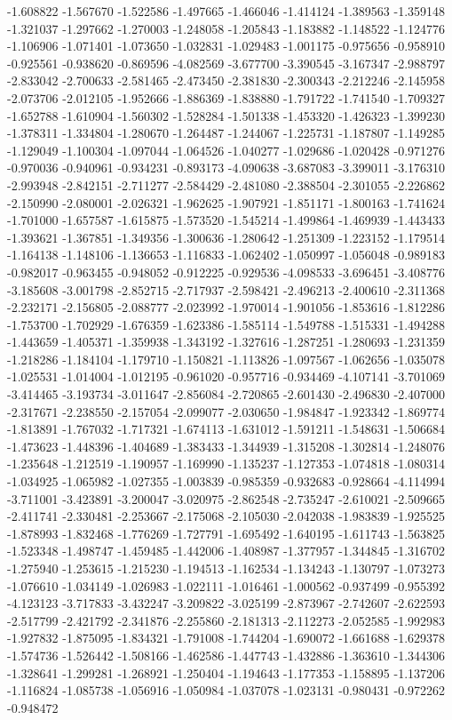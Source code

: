 -1.608822
-1.567670
-1.522586
-1.497665
-1.466046
-1.414124
-1.389563
-1.359148
-1.321037
-1.297662
-1.270003
-1.248058
-1.205843
-1.183882
-1.148522
-1.124776
-1.106906
-1.071401
-1.073650
-1.032831
-1.029483
-1.001175
-0.975656
-0.958910
-0.925561
-0.938620
-0.869596
-4.082569
-3.677700
-3.390545
-3.167347
-2.988797
-2.833042
-2.700633
-2.581465
-2.473450
-2.381830
-2.300343
-2.212246
-2.145958
-2.073706
-2.012105
-1.952666
-1.886369
-1.838880
-1.791722
-1.741540
-1.709327
-1.652788
-1.610904
-1.560302
-1.528284
-1.501338
-1.453320
-1.426323
-1.399230
-1.378311
-1.334804
-1.280670
-1.264487
-1.244067
-1.225731
-1.187807
-1.149285
-1.129049
-1.100304
-1.097044
-1.064526
-1.040277
-1.029686
-1.020428
-0.971276
-0.970036
-0.940961
-0.934231
-0.893173
-4.090638
-3.687083
-3.399011
-3.176310
-2.993948
-2.842151
-2.711277
-2.584429
-2.481080
-2.388504
-2.301055
-2.226862
-2.150990
-2.080001
-2.026321
-1.962625
-1.907921
-1.851171
-1.800163
-1.741624
-1.701000
-1.657587
-1.615875
-1.573520
-1.545214
-1.499864
-1.469939
-1.443433
-1.393621
-1.367851
-1.349356
-1.300636
-1.280642
-1.251309
-1.223152
-1.179514
-1.164138
-1.148106
-1.136653
-1.116833
-1.062402
-1.050997
-1.056048
-0.989183
-0.982017
-0.963455
-0.948052
-0.912225
-0.929536
-4.098533
-3.696451
-3.408776
-3.185608
-3.001798
-2.852715
-2.717937
-2.598421
-2.496213
-2.400610
-2.311368
-2.232171
-2.156805
-2.088777
-2.023992
-1.970014
-1.901056
-1.853616
-1.812286
-1.753700
-1.702929
-1.676359
-1.623386
-1.585114
-1.549788
-1.515331
-1.494288
-1.443659
-1.405371
-1.359938
-1.343192
-1.327616
-1.287251
-1.280693
-1.231359
-1.218286
-1.184104
-1.179710
-1.150821
-1.113826
-1.097567
-1.062656
-1.035078
-1.025531
-1.014004
-1.012195
-0.961020
-0.957716
-0.934469
-4.107141
-3.701069
-3.414465
-3.193734
-3.011647
-2.856084
-2.720865
-2.601430
-2.496830
-2.407000
-2.317671
-2.238550
-2.157054
-2.099077
-2.030650
-1.984847
-1.923342
-1.869774
-1.813891
-1.767032
-1.717321
-1.674113
-1.631012
-1.591211
-1.548631
-1.506684
-1.473623
-1.448396
-1.404689
-1.383433
-1.344939
-1.315208
-1.302814
-1.248076
-1.235648
-1.212519
-1.190957
-1.169990
-1.135237
-1.127353
-1.074818
-1.080314
-1.034925
-1.065982
-1.027355
-1.003839
-0.985359
-0.932683
-0.928664
-4.114994
-3.711001
-3.423891
-3.200047
-3.020975
-2.862548
-2.735247
-2.610021
-2.509665
-2.411741
-2.330481
-2.253667
-2.175068
-2.105030
-2.042038
-1.983839
-1.925525
-1.878993
-1.832468
-1.776269
-1.727791
-1.695492
-1.640195
-1.611743
-1.563825
-1.523348
-1.498747
-1.459485
-1.442006
-1.408987
-1.377957
-1.344845
-1.316702
-1.275940
-1.253615
-1.215230
-1.194513
-1.162534
-1.134243
-1.130797
-1.073273
-1.076610
-1.034149
-1.026983
-1.022111
-1.016461
-1.000562
-0.937499
-0.955392
-4.123123
-3.717833
-3.432247
-3.209822
-3.025199
-2.873967
-2.742607
-2.622593
-2.517799
-2.421792
-2.341876
-2.255860
-2.181313
-2.112273
-2.052585
-1.992983
-1.927832
-1.875095
-1.834321
-1.791008
-1.744204
-1.690072
-1.661688
-1.629378
-1.574736
-1.526442
-1.508166
-1.462586
-1.447743
-1.432886
-1.363610
-1.344306
-1.328641
-1.299281
-1.268921
-1.250404
-1.194643
-1.177353
-1.158895
-1.137206
-1.116824
-1.085738
-1.056916
-1.050984
-1.037078
-1.023131
-0.980431
-0.972262
-0.948472

